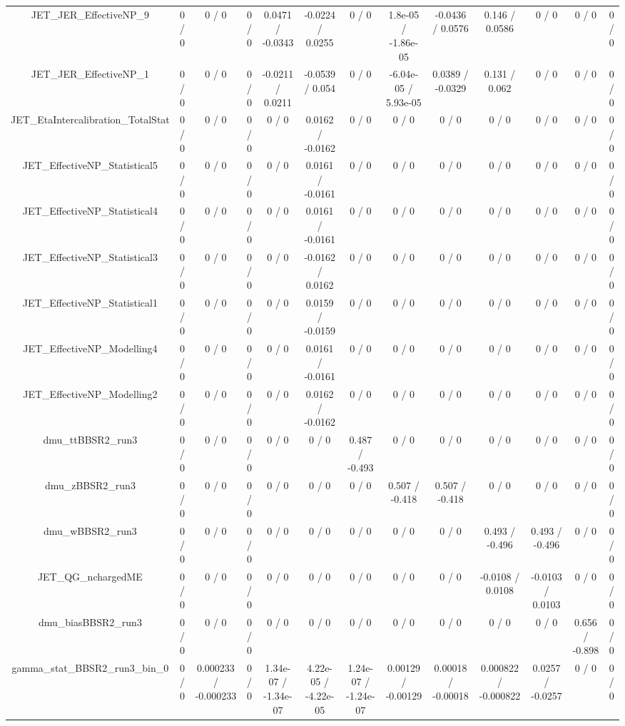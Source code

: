 \documentclass[10pt]{article}
\begin{document}
\begin{table}[htbp]
\begin{center}
\begin{tabular}{|c|c|c|c|c|c|c|c|c|c|c|c|c|}
  JET_JER_EffectiveNP_9 & 0 / 0 & 0 / 0 & 0 / 0 & 0.0471 / -0.0343 & -0.0224 / 0.0255 & 0 / 0 & 1.8e-05 / -1.86e-05 & -0.0436 / 0.0576 & 0.146 / 0.0586 & 0 / 0 & 0 / 0 & 0 / 0 \\ 
  JET_JER_EffectiveNP_1 & 0 / 0 & 0 / 0 & 0 / 0 & -0.0211 / 0.0211 & -0.0539 / 0.054 & 0 / 0 & -6.04e-05 / 5.93e-05 & 0.0389 / -0.0329 & 0.131 / 0.062 & 0 / 0 & 0 / 0 & 0 / 0 \\ 
  JET_EtaIntercalibration_TotalStat & 0 / 0 & 0 / 0 & 0 / 0 & 0 / 0 & 0.0162 / -0.0162 & 0 / 0 & 0 / 0 & 0 / 0 & 0 / 0 & 0 / 0 & 0 / 0 & 0 / 0 \\ 
  JET_EffectiveNP_Statistical5 & 0 / 0 & 0 / 0 & 0 / 0 & 0 / 0 & 0.0161 / -0.0161 & 0 / 0 & 0 / 0 & 0 / 0 & 0 / 0 & 0 / 0 & 0 / 0 & 0 / 0 \\ 
  JET_EffectiveNP_Statistical4 & 0 / 0 & 0 / 0 & 0 / 0 & 0 / 0 & 0.0161 / -0.0161 & 0 / 0 & 0 / 0 & 0 / 0 & 0 / 0 & 0 / 0 & 0 / 0 & 0 / 0 \\ 
  JET_EffectiveNP_Statistical3 & 0 / 0 & 0 / 0 & 0 / 0 & 0 / 0 & -0.0162 / 0.0162 & 0 / 0 & 0 / 0 & 0 / 0 & 0 / 0 & 0 / 0 & 0 / 0 & 0 / 0 \\ 
  JET_EffectiveNP_Statistical1 & 0 / 0 & 0 / 0 & 0 / 0 & 0 / 0 & 0.0159 / -0.0159 & 0 / 0 & 0 / 0 & 0 / 0 & 0 / 0 & 0 / 0 & 0 / 0 & 0 / 0 \\ 
  JET_EffectiveNP_Modelling4 & 0 / 0 & 0 / 0 & 0 / 0 & 0 / 0 & 0.0161 / -0.0161 & 0 / 0 & 0 / 0 & 0 / 0 & 0 / 0 & 0 / 0 & 0 / 0 & 0 / 0 \\ 
  JET_EffectiveNP_Modelling2 & 0 / 0 & 0 / 0 & 0 / 0 & 0 / 0 & 0.0162 / -0.0162 & 0 / 0 & 0 / 0 & 0 / 0 & 0 / 0 & 0 / 0 & 0 / 0 & 0 / 0 \\ 
  dmu_ttBBSR2_run3 & 0 / 0 & 0 / 0 & 0 / 0 & 0 / 0 & 0 / 0 & 0.487 / -0.493 & 0 / 0 & 0 / 0 & 0 / 0 & 0 / 0 & 0 / 0 & 0 / 0 \\ 
  dmu_zBBSR2_run3 & 0 / 0 & 0 / 0 & 0 / 0 & 0 / 0 & 0 / 0 & 0 / 0 & 0.507 / -0.418 & 0.507 / -0.418 & 0 / 0 & 0 / 0 & 0 / 0 & 0 / 0 \\ 
  dmu_wBBSR2_run3 & 0 / 0 & 0 / 0 & 0 / 0 & 0 / 0 & 0 / 0 & 0 / 0 & 0 / 0 & 0 / 0 & 0.493 / -0.496 & 0.493 / -0.496 & 0 / 0 & 0 / 0 \\ 
  JET_QG_nchargedME & 0 / 0 & 0 / 0 & 0 / 0 & 0 / 0 & 0 / 0 & 0 / 0 & 0 / 0 & 0 / 0 & -0.0108 / 0.0108 & -0.0103 / 0.0103 & 0 / 0 & 0 / 0 \\ 
  dmu_biasBBSR2_run3 & 0 / 0 & 0 / 0 & 0 / 0 & 0 / 0 & 0 / 0 & 0 / 0 & 0 / 0 & 0 / 0 & 0 / 0 & 0 / 0 & 0.656 / -0.898 & 0 / 0 \\ 
  gamma_stat_BBSR2_run3_bin_0 & 0 / 0 & 0.000233 / -0.000233 & 0 / 0 & 1.34e-07 / -1.34e-07 & 4.22e-05 / -4.22e-05 & 1.24e-07 / -1.24e-07 & 0.00129 / -0.00129 & 0.00018 / -0.00018 & 0.000822 / -0.000822 & 0.0257 / -0.0257 & 0 / 0 & 0 / 0 \\ 

\end{tabular}
\end{center}
\end{table}
\end{document}
